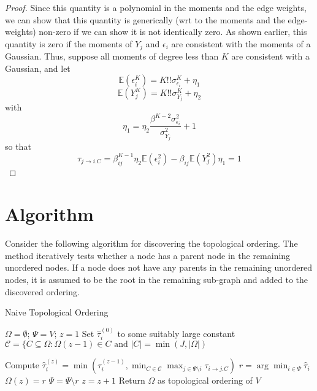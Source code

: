 \documentclass[]{article}
\newcommand{\E}{\mathbb{E}}
\begin{document}
\begin{proof}
Since this quantity is a polynomial in the moments and the edge weights, we can show that this quantity is generically (wrt to the moments and the edge-weights) non-zero if we can show it is not identically zero. As shown earlier, this quantity is zero if the moments of $Y_j$ and $\epsilon_i$ are consistent with the moments of a Gaussian. Thus, suppose all moments of degree less than $K$ are consistent with a Gaussian, and let  \[\E(\epsilon_i^K) = K!!\sigma_{\epsilon_i}^K + \eta_1\]
\[\E(Y_j^K) = K!!\sigma_{Y_j}^K + \eta_2\]
with
\[\eta_1 = \eta_2\frac{\beta^{K-2}\sigma_{\epsilon_i}^2}{\sigma_{Y_j}^2} + 1\]
so that
\begin{equation}
\tau_{j\rightarrow i.C} = \beta_{ij}^{K-1}\eta_2\E(\epsilon_i^2) - \beta_{ij}\E(Y_j^2)\eta_1 = 1
\end{equation}


\end{proof}


\section{Algorithm}

Consider the following algorithm for discovering the topological ordering. The method iteratively tests whether a node has a parent node in the remaining unordered nodes. If a node does not have any parents in the remaining unordered nodes, it is assumed to be the root in the remaining sub-graph and added to the discovered ordering.

\begin{algorithm}[htbp!]
\caption{\label{alg:topOrder}Naive Topological Ordering}
\begin{algorithmic}
\State $\Omega = \emptyset$; $\Psi = V$; $z = 1$
\State Set $\hat \tau_{i}^{(0)}$ to some suitably large constant
	\State $\mathcal{C} = \{C \subseteq \Omega: \Omega(z-1) \in C \text{ and } |C| = \min(J, |\Omega|)$

	\State Compute $\hat \tau_{i}^{(z)} = \min\left(\tau_{i}^{(z-1)}, \min_{C \in \mathcal{C}} \max_{j \in \Psi \setminus i} \tau_{i\rightarrow j.C}\right)$ 
	\EndFor	 
	\State $r = \arg\min_{i \in \Psi} \hat \tau_{i}$
	\State $\Omega(z) = r$
	\State $\Psi = \Psi \setminus r$
	\State $z = z + 1$
\EndWhile
\State Return $\Omega$ as topological ordering of $V$
\end{algorithmic}
\end{algorithm}
\end{document}
